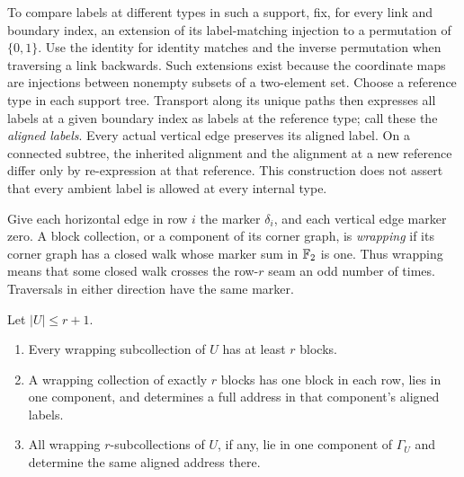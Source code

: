 To compare labels at different types in such a support, fix, for every
link and boundary index, an extension of its label-matching injection to
a permutation of $\{0,1\}$. Use the identity for identity matches and
the inverse permutation when traversing a link backwards. Such
extensions exist because the coordinate maps are injections between
nonempty subsets of a two-element set. Choose a reference type in each
support tree. Transport along its unique paths then expresses all labels
at a given boundary index as labels at the reference type; call these
the \emph{aligned labels}. Every actual vertical edge preserves its
aligned label. On a connected subtree, the inherited alignment and the
alignment at a new reference differ only by re-expression at that
reference. This construction does not assert that every ambient label is
allowed at every internal type.

Give each horizontal edge in row $i$ the marker $\delta_i$, and each
vertical edge marker zero. A block collection, or a component of its
corner graph, is \emph{wrapping} if its corner graph has a closed walk
whose marker sum in $\mathbb F_2$ is one. Thus wrapping means that some closed
walk crosses the row-$r$ seam an odd number of times. Traversals in either
direction have the same marker.

\begin{lemma}
\label{lem:wrapping-address}
Let $|U|\leq r+1$.
\begin{enumerate}
\item Every wrapping subcollection of $U$ has at least $r$ blocks.
\item A wrapping collection of exactly $r$ blocks has one block in
each row, lies in one component, and determines a full address in that
component's aligned labels.
\item All wrapping $r$-subcollections of $U$, if any, lie in one
component of $\Gamma_U$ and determine the same aligned address there.
\end{enumerate}
\end{lemma}

